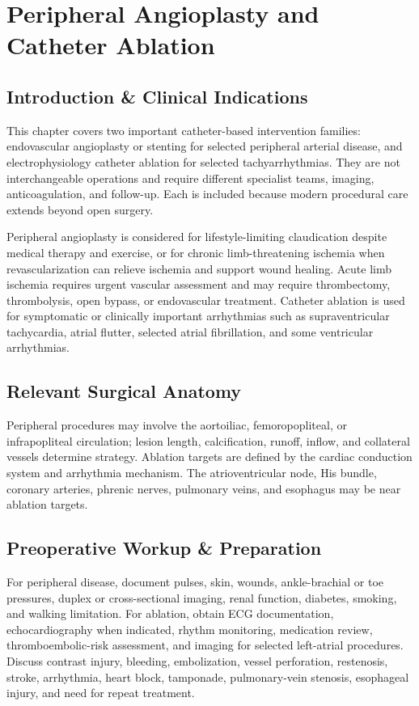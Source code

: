 \chapter{Peripheral Angioplasty and Catheter Ablation}

\section*{Introduction \& Clinical Indications}
This chapter covers two important catheter-based intervention families: endovascular angioplasty or stenting for selected peripheral arterial disease, and electrophysiology catheter ablation for selected tachyarrhythmias. They are not interchangeable operations and require different specialist teams, imaging, anticoagulation, and follow-up. Each is included because modern procedural care extends beyond open surgery.

Peripheral angioplasty is considered for lifestyle-limiting claudication despite medical therapy and exercise, or for chronic limb-threatening ischemia when revascularization can relieve ischemia and support wound healing. Acute limb ischemia requires urgent vascular assessment and may require thrombectomy, thrombolysis, open bypass, or endovascular treatment. Catheter ablation is used for symptomatic or clinically important arrhythmias such as supraventricular tachycardia, atrial flutter, selected atrial fibrillation, and some ventricular arrhythmias.

\section*{Relevant Surgical Anatomy}
Peripheral procedures may involve the aortoiliac, femoropopliteal, or infrapopliteal circulation; lesion length, calcification, runoff, inflow, and collateral vessels determine strategy. Ablation targets are defined by the cardiac conduction system and arrhythmia mechanism. The atrioventricular node, His bundle, coronary arteries, phrenic nerves, pulmonary veins, and esophagus may be near ablation targets.

\section*{Preoperative Workup \& Preparation}
For peripheral disease, document pulses, skin, wounds, ankle-brachial or toe pressures, duplex or cross-sectional imaging, renal function, diabetes, smoking, and walking limitation. For ablation, obtain ECG documentation, echocardiography when indicated, rhythm monitoring, medication review, thromboembolic-risk assessment, and imaging for selected left-atrial procedures. Discuss contrast injury, bleeding, embolization, vessel perforation, restenosis, stroke, arrhythmia, heart block, tamponade, pulmonary-vein stenosis, esophageal injury, and need for repeat treatment.

